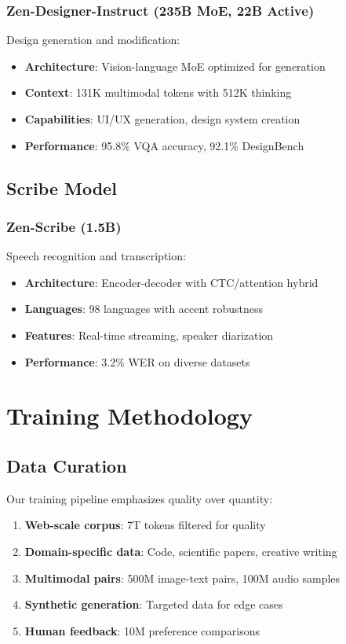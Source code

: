 \documentclass[11pt,a4paper]{article}
\begin{document}
\subsubsection{Zen-Designer-Instruct (235B MoE, 22B Active)}
Design generation and modification:
\begin{itemize}
    \item \textbf{Architecture}: Vision-language MoE optimized for generation
    \item \textbf{Context}: 131K multimodal tokens with 512K thinking
    \item \textbf{Capabilities}: UI/UX generation, design system creation
    \item \textbf{Performance}: 95.8\% VQA accuracy, 92.1\% DesignBench
\end{itemize}

\subsection{Scribe Model}

\subsubsection{Zen-Scribe (1.5B)}
Speech recognition and transcription:
\begin{itemize}
    \item \textbf{Architecture}: Encoder-decoder with CTC/attention hybrid
    \item \textbf{Languages}: 98 languages with accent robustness
    \item \textbf{Features}: Real-time streaming, speaker diarization
    \item \textbf{Performance}: 3.2\% WER on diverse datasets
\end{itemize}

\section{Training Methodology}

\subsection{Data Curation}

Our training pipeline emphasizes quality over quantity:
\begin{enumerate}
    \item \textbf{Web-scale corpus}: 7T tokens filtered for quality
    \item \textbf{Domain-specific data}: Code, scientific papers, creative writing
    \item \textbf{Multimodal pairs}: 500M image-text pairs, 100M audio samples
    \item \textbf{Synthetic generation}: Targeted data for edge cases
    \item \textbf{Human feedback}: 10M preference comparisons
\end{enumerate}
\end{document}
